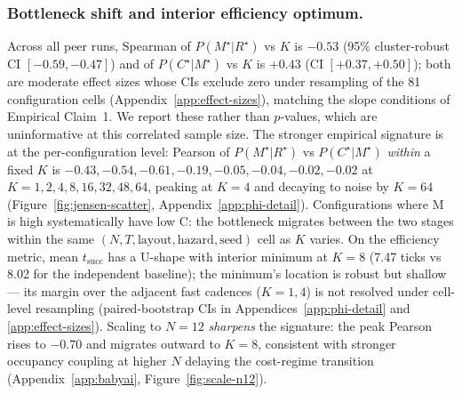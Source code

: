 \documentclass{article}
\begin{document}
\subsubsection{Bottleneck shift and interior efficiency optimum.}
Across all peer runs, Spearman of $P(M^\star|R^\star)$ vs $K$ is $-0.53$ (95\% cluster-robust CI $[-0.59,-0.47]$) and of $P(C^\star|M^\star)$ vs $K$ is $+0.43$ (CI $[+0.37,+0.50]$); both are moderate effect sizes whose CIs exclude zero under resampling of the 81 configuration cells (Appendix~\ref{app:effect-sizes}), matching the slope conditions of Empirical Claim~1. We report these rather than $p$-values, which are uninformative at this correlated sample size. The stronger empirical signature is at the per-configuration level: Pearson of $P(M^\star|R^\star)$ vs $P(C^\star|M^\star)$ \emph{within} a fixed $K$ is $-0.43, -0.54, -0.61, -0.19, -0.05, -0.04, -0.02, -0.02$ at $K{=}1,2,4,8,16,32,48,64$, peaking at $K{=}4$ and decaying to noise by $K{=}64$ (Figure~\ref{fig:jensen-scatter}, Appendix~\ref{app:phi-detail}). Configurations where M is high systematically have low C: the bottleneck migrates between the two stages within the same $(N,T,\text{layout},\text{hazard},\text{seed})$ cell as $K$ varies. On the efficiency metric, mean $t_{\mathrm{succ}}$ has a U-shape with interior minimum at $K{=}8$ (7.47 ticks vs 8.02 for the independent baseline); the minimum's location is robust but shallow --- its margin over the adjacent fast cadences ($K{=}1,4$) is not resolved under cell-level resampling (paired-bootstrap CIs in Appendices~\ref{app:phi-detail} and \ref{app:effect-sizes}). Scaling to $N{=}12$ \emph{sharpens} the signature: the peak Pearson rises to $-0.70$ and
migrates outward to $K\!=\!8$, consistent with stronger occupancy
coupling at higher $N$ delaying the cost-regime transition
(Appendix~\ref{app:babyai}, Figure~\ref{fig:scale-n12}).
\end{document}
